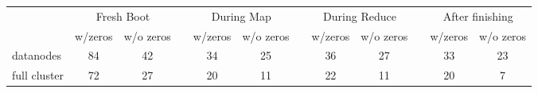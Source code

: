 \documentclass{article}
\begin{document}
\thispagestyle{empty}
\begin{tabular}{lccccccccccc}
  \toprule
  & \multicolumn{2}{c}{Fresh Boot} && \multicolumn{2}{c}{During Map} && \multicolumn{2}{c}{During Reduce} && \multicolumn{2}{c}{After finishing}\\
  \cmidrule{2-3} \cmidrule{5-6} \cmidrule{8-9} \cmidrule{11-12}
  & w/zeros & w/o zeros && w/zeros & w/o zeros && w/zeros & w/o zeros && w/zeros & w/o zeros\\
  \midrule
    datanodes & 84 & 42 && 34 & 25 && 36 & 27 && 33 & 23\\
    full cluster & 72 & 27 && 20 & 11 &&  22 & 11 && 20 & 7\\
  \bottomrule
\end{tabular}
\end{document}
